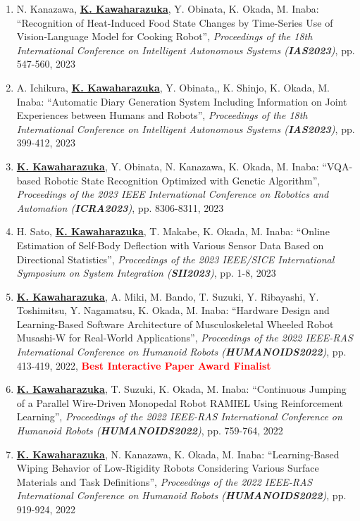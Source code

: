 \documentclass[letterpaper]{article}
\begin{document}
\begin{enumerate}
\item N. Kanazawa, \underline{\textbf{K. Kawaharazuka}}, Y. Obinata, K. Okada, M. Inaba: ``Recognition of Heat-Induced Food State Changes by Time-Series Use of Vision-Language Model for Cooking Robot'', \textit{Proceedings of the 18th International Conference on Intelligent Autonomous Systems (\textit{\textbf{IAS2023}})}, pp. 547-560, 2023
\item A. Ichikura, \underline{\textbf{K. Kawaharazuka}}, Y. Obinata,, K. Shinjo, K. Okada, M. Inaba: ``Automatic Diary Generation System Including Information on Joint Experiences between Humans and Robots'', \textit{Proceedings of the 18th International Conference on Intelligent Autonomous Systems (\textit{\textbf{IAS2023}})}, pp. 399-412, 2023
\item \underline{\textbf{K. Kawaharazuka}}, Y. Obinata, N. Kanazawa, K. Okada, M. Inaba: ``VQA-based Robotic State Recognition Optimized with Genetic Algorithm'', \textit{Proceedings of the 2023 IEEE International Conference on Robotics and Automation (\textit{\textbf{ICRA2023}})}, pp. 8306-8311, 2023
\item H. Sato, \underline{\textbf{K. Kawaharazuka}}, T. Makabe, K. Okada, M. Inaba: ``Online Estimation of Self-Body Deflection with Various Sensor Data Based on Directional Statistics'', \textit{Proceedings of the 2023 IEEE/SICE International Symposium on System Integration (\textit{\textbf{SII2023}})}, pp. 1-8, 2023
\item \underline{\textbf{K. Kawaharazuka}}, A. Miki, M. Bando, T. Suzuki, Y. Ribayashi, Y. Toshimitsu, Y. Nagamatsu, K. Okada, M. Inaba: ``Hardware Design and Learning-Based Software Architecture of Musculoskeletal Wheeled Robot Musashi-W for Real-World Applications'', \textit{Proceedings of the 2022 IEEE-RAS International Conference on Humanoid Robots (\textit{\textbf{HUMANOIDS2022}})}, pp. 413-419, 2022, \textbf{\textcolor{red}{Best Interactive Paper Award Finalist}}
\item \underline{\textbf{K. Kawaharazuka}}, T. Suzuki, K. Okada, M. Inaba: ``Continuous Jumping of a Parallel Wire-Driven Monopedal Robot RAMIEL Using Reinforcement Learning'', \textit{Proceedings of the 2022 IEEE-RAS International Conference on Humanoid Robots (\textit{\textbf{HUMANOIDS2022}})}, pp. 759-764, 2022
\item \underline{\textbf{K. Kawaharazuka}}, N. Kanazawa, K. Okada, M. Inaba: ``Learning-Based Wiping Behavior of Low-Rigidity Robots Considering Various Surface Materials and Task Definitions'', \textit{Proceedings of the 2022 IEEE-RAS International Conference on Humanoid Robots (\textit{\textbf{HUMANOIDS2022}})}, pp. 919-924, 2022

\end{enumerate}
\end{document}
